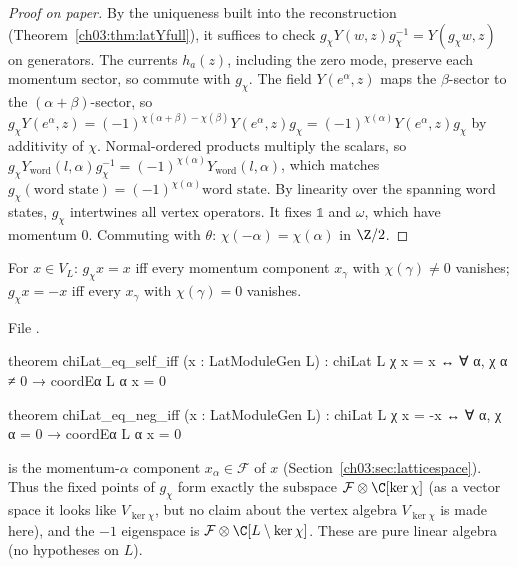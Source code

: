 \begin{proof}[Proof on paper]
By the uniqueness built into the reconstruction (Theorem~\ref{ch03:thm:latYfull}), it suffices to
check $g_\chi Y(w,z)g_\chi^{-1}=Y(g_\chi w,z)$ on generators. The currents $h_a(z)$, including the
zero mode, preserve each momentum sector, so commute with $g_\chi$. The field $Y(e^\alpha,z)$
maps the $\beta$-sector to the $(\alpha+\beta)$-sector, so
$g_\chi Y(e^\alpha,z)=(-1)^{\chi(\alpha+\beta)-\chi(\beta)}Y(e^\alpha,z)g_\chi=(-1)^{\chi(\alpha)}
Y(e^\alpha,z)g_\chi$ by additivity of $\chi$. Normal-ordered products multiply the scalars, so
$g_\chi Y_{\mathrm{word}}(l,\alpha)g_\chi^{-1}=(-1)^{\chi(\alpha)}Y_{\mathrm{word}}(l,\alpha)$,
which matches $g_\chi(\text{word state})=(-1)^{\chi(\alpha)}\text{word state}$. By linearity over
the spanning word states, $g_\chi$ intertwines all vertex operators. It fixes $\mathbb 1$ and
$\omega$, which have momentum $0$. Commuting with $\theta$: $\chi(-\alpha)=\chi(\alpha)$ in $\Z/2$.
\end{proof}

\begin{theorem}\label{ch03:thm:chieig}
For $x\in V_L$: $g_\chi x=x$ iff every momentum component $x_\gamma$ with $\chi(\gamma)\ne0$
vanishes; $g_\chi x=-x$ iff every $x_\gamma$ with $\chi(\gamma)=0$ vanishes.
\end{theorem}
\noindent File .
\begin{leancode}
theorem chiLat_eq_self_iff (x : LatModuleGen L) :
    chiLat L χ x = x ↔ ∀ α, χ α ≠ 0 → coordEα L α x = 0

theorem chiLat_eq_neg_iff (x : LatModuleGen L) :
    chiLat L χ x = -x ↔ ∀ α, χ α = 0 → coordEα L α x = 0
\end{leancode}
\begin{dictionary}
 is the momentum-$\alpha$ component $x_\alpha\in\mathcal F$ of $x$
(Section~\ref{ch03:sec:latticespace}). Thus the fixed points of $g_\chi$ form exactly the
subspace $\mathcal F\otimes\C[\ker\chi]$ (as a vector space it looks like $V_{\ker\chi}$, but no
claim about the vertex algebra $V_{\ker\chi}$ is made here), and the $-1$ eigenspace is
$\mathcal F\otimes\C[L\setminus\ker\chi]$. These are pure linear algebra (no hypotheses on $L$).
\end{dictionary}

